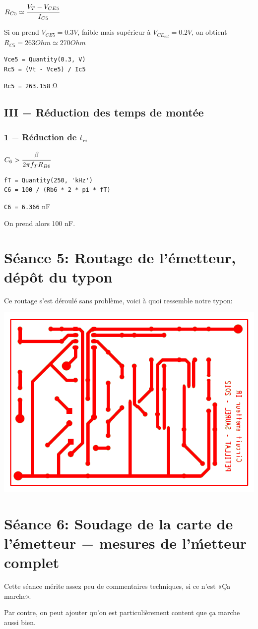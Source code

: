 $R_{C5}\simeq\cfrac{V_T-V_{CE5}}{I_{C5}}$

Si on prend $V_{CE5} = 0.3V$, faible mais supérieur à $V_{CE_{sat}}=0.2V$, on obtient $R_{C5}=263 Ohm \simeq 270 Ohm$
\begin{verbatim}
Vce5 = Quantity(0.3, V)
Rc5 = (Vt - Vce5) / Ic5
\end{verbatim}
\verb|Rc5 = 263.158| \si\ohm
\subsection{III − Réduction des temps de montée}
\subsubsection{1 − Réduction de $t_{ri}$}

$C_6 > \cfrac{\beta}{2\pi f_TR_{B6}}$
\begin{verbatim}
fT = Quantity(250, 'kHz')
C6 = 100 / (Rb6 * 2 * pi * fT)
\end{verbatim}
\verb|C6 = 6.366| \si{\nano\farad}

On prend alors 100 \si{\nano\farad}.
\section{Séance 5: Routage de l’émetteur, dépôt du typon}
Ce routage s’est déroulé sans problème, voici à quoi ressemble notre typon:

\includegraphics[width=\linewidth]{../img/routage.png}

\section{Séance 6: Soudage de la carte de l’émetteur − mesures de l’ḿetteur complet}
Cette séance mérite assez peu de commentaires techniques, si ce n’est «Ça marche».

Par contre, on peut ajouter qu’on est particulièrement content que ça marche aussi bien.
